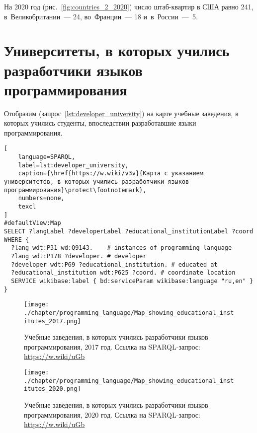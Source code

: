 На 2020 год (рис.~\ref{fig:countries_2_2020}) число штаб-квартир в США равно 241, 
в~Великобритании~--- 24, во~Франции~--- 18 и~в~России~---~5.







\newpage
\section{Университеты, в которых учились разработчики языков программирования}
Отобразим (запрос~\ref{lst:developer_university}) на карте учебные заведения, в которых учились студенты, впоследствии разработавшие языки программирования.

\begin{lstlisting}[
	language=SPARQL,
	label=lst:developer_university,
	caption={\href{https://w.wiki/v3v}{Карта с указанием университетов, в которых учились разработчики языков программирования}\protect\footnotemark},
    numbers=none,
	texcl
]
#defaultView:Map
SELECT ?langLabel ?developerLabel ?educational_institutionLabel ?coord WHERE {
  ?lang wdt:P31 wd:Q9143.    # instances of programming language
  ?lang wdt:P178 ?developer. # developer
  ?developer wdt:P69 ?educational_institution. # educated at
  ?educational_institution wdt:P625 ?coord. # coordinate location
  SERVICE wikibase:label { bd:serviceParam wikibase:language "ru,en" }
}
\end{lstlisting}

\begin{figure}[h]
\centering
	\texttt{[image: ./chapter/programming\_language/Map\_showing\_educational\_institutes\_2017.png]}
	\caption[Учебные заведения, в которых учились разработчики языков программирования, 2017 год.]{Учебные заведения, в которых учились разработчики языков программирования, 2017 год. Ссылка на SPARQL-запрос: \href{https://w.wiki/uGb}{https://w.wiki/uGb}}
	\label{fig:universities_2017}
\end{figure}
\begin{figure}[h]
\centering
	\texttt{[image: ./chapter/programming\_language/Map\_showing\_educational\_institutes\_2020.png]}
	\caption[Учебные заведения, в которых учились разработчики языков программирования, 2020 год.]{Учебные заведения, в которых учились разработчики языков программирования, 2020 год. Ссылка на SPARQL-запрос: \href{https://w.wiki/uGb}{https://w.wiki/uGb}}
	\label{fig:universities_2020}
\end{figure}

